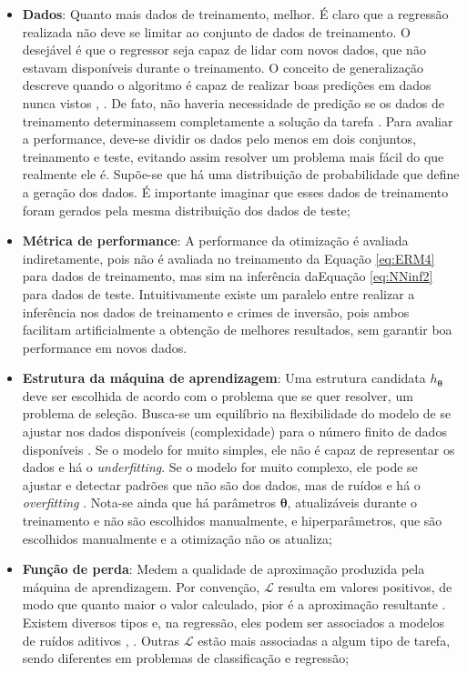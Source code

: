\begin{itemize}
\item \textbf{Dados}: Quanto mais dados de treinamento, melhor. É claro que a regressão realizada não deve se limitar ao conjunto de dados de treinamento. O desejável é que o regressor seja capaz de lidar com novos dados, que não estavam disponíveis durante o treinamento. O conceito de generalização descreve quando o algoritmo é capaz de realizar boas predições em dados nunca vistos \cite{geron2019hands-on}, \cite[pág. 110]{goodfellow2016deep}. De fato, não haveria necessidade de predição se os dados de treinamento determinassem completamente a solução da tarefa \cite[pág. 73-4]{cherkassky2007learning}. Para avaliar a performance, deve-se dividir os dados pelo menos em dois conjuntos, treinamento e teste, evitando assim resolver um problema mais fácil do que realmente ele é. Supõe-se que há uma distribuição de probabilidade que define a geração dos dados. É importante imaginar que esses dados de treinamento foram gerados pela mesma distribuição dos dados de teste;

\item \textbf{Métrica de performance}: A performance da otimização é avaliada indiretamente, pois não é avaliada no treinamento da Equação \eqref{eq:ERM4} para dados de treinamento, mas sim na inferência daEquação \eqref{eq:NNinf2} para dados de teste.  Intuitivamente existe um paralelo entre realizar a inferência nos dados de treinamento e crimes de inversão, pois ambos facilitam artificialmente a obtenção de melhores resultados, sem garantir boa performance em novos dados. 

\item \textbf{Estrutura da máquina de aprendizagem}: Uma estrutura candidata $h_{\bm{\theta}}$ deve ser escolhida de acordo com o problema que se quer resolver, um problema de seleção. Busca-se um equilíbrio na flexibilidade do modelo de se ajustar nos dados disponíveis (complexidade) para o número finito de dados disponíveis \cite[pág. 73]{cherkassky2007learning}. Se o modelo for muito simples, ele não é capaz de representar os dados e há o \textit{underfitting}. Se o modelo for muito complexo, ele pode se ajustar e detectar padrões que não são dos dados, mas de ruídos e há o \textit{overfitting} \cite{geron2019hands-on}.  Nota-se ainda que há parâmetros $\bm{\theta}$, atualizáveis durante o treinamento e não são escolhidos manualmente, e hiperparâmetros, que são escolhidos manualmente e a otimização não os atualiza;

\item \textbf{Função de perda}: Medem a qualidade de aproximação produzida pela máquina de aprendizagem. Por convenção, $\mathcal{L}$ resulta em valores positivos, de modo que quanto maior o valor calculado, pior é a aproximação resultante \cite[pág. 25]{cherkassky2007learning}. Existem diversos tipos e, na regressão,  eles podem ser associados a modelos de ruídos aditivos \cite[pág. Tabela 2]{Chen2002}, \cite[pág. 109]{alvarez2017digital}. Outras $\mathcal{L}$ estão mais associadas a algum tipo de tarefa, sendo diferentes em problemas de classificação e regressão;


\end{itemize}
